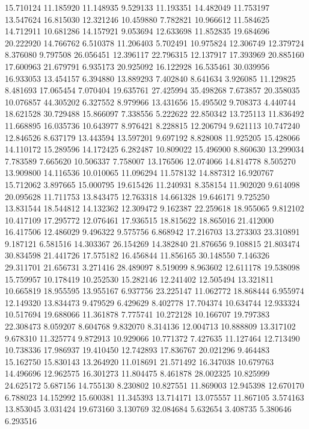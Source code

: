 15.710124
11.185920
11.148935
9.529133
11.193351
14.482049
11.753197
13.547624
16.815030
12.321246
10.459880
7.782821
10.966612
11.584625
14.712911
10.681286
14.157921
9.053694
12.633698
11.852835
19.684696
20.222920
14.766762
6.510378
11.206403
5.702491
10.975824
12.306749
12.379724
8.376080
9.797508
26.056451
12.396117
22.796315
12.137917
17.393969
20.885160
17.600963
21.679791
6.935173
20.925092
16.122928
16.535461
30.039956
16.933053
13.454157
6.394880
13.889293
7.402840
8.641634
3.926085
11.129825
8.481693
17.065454
7.070404
19.635761
27.425994
35.498268
7.673857
20.358035
10.076857
44.305202
6.327552
8.979966
13.431656
15.495502
9.708373
4.440744
18.621528
30.729488
15.866097
7.338556
5.222622
22.850342
13.725113
11.836492
11.668895
16.035736
10.643977
8.976421
8.228815
12.206794
9.621113
10.747240
12.846526
8.637179
13.443594
13.597201
9.697192
8.828008
11.925205
15.428066
14.110172
15.289596
14.172425
6.282487
10.809022
15.496900
8.860630
13.299034
7.783589
7.665620
10.506337
7.758007
13.176506
12.074066
14.814778
8.505270
13.909800
14.116536
10.010065
11.096294
11.578132
14.887312
16.920767
15.712062
3.897665
15.000795
19.615426
11.240931
8.358154
11.902020
9.614098
20.095628
11.711753
13.843475
12.763318
14.661328
19.646171
9.725250
13.831544
18.544812
14.132362
12.309472
9.162387
22.259618
18.955065
9.812102
10.417109
17.295772
12.076461
17.936515
18.815622
18.865016
21.412000
16.417506
12.486029
9.496322
9.575756
6.868942
17.216703
13.273303
23.310891
9.187121
6.581516
14.303367
26.154269
14.382840
21.876656
9.108815
21.803474
30.834598
21.441726
17.575182
16.456844
11.856165
30.148550
7.146326
29.311701
21.656731
3.271416
28.489097
8.519099
8.963602
12.611178
19.538098
15.759957
10.178419
10.252530
15.282146
12.241402
12.505494
13.321811
10.665819
18.955595
13.955167
6.937756
23.225147
11.062772
18.868444
6.955974
12.149320
13.834473
9.479529
6.429629
8.402778
17.704374
10.634744
12.933324
10.517694
19.688066
11.361878
7.775741
10.272128
10.166707
19.797383
22.308473
8.059207
8.604768
9.832070
8.314136
12.004713
10.888809
13.317102
9.678310
11.325774
9.872913
10.929066
10.771372
7.427635
11.127464
12.713490
10.738336
17.986937
19.410450
12.742893
17.836767
20.021296
9.464483
15.162750
15.830143
13.264920
11.018691
21.571492
16.347038
10.679763
14.496696
12.962575
16.301273
11.804475
8.461878
28.002325
10.825999
24.625172
5.687156
14.755130
8.230802
10.827551
11.869003
12.945398
12.670170
6.788023
14.152992
15.600381
11.345393
13.714171
13.075557
11.867105
3.574163
13.853045
3.031424
19.673160
3.130769
32.084684
5.632654
3.408735
5.380646
6.293516
